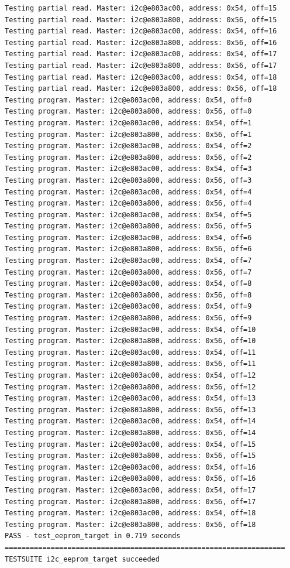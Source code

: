\documentclass[11pt,a4paper,oneside]{article}
\begin{document}
\begin{lstlisting}
Testing partial read. Master: i2c@e803ac00, address: 0x54, off=15
Testing partial read. Master: i2c@e803a800, address: 0x56, off=15
Testing partial read. Master: i2c@e803ac00, address: 0x54, off=16
Testing partial read. Master: i2c@e803a800, address: 0x56, off=16
Testing partial read. Master: i2c@e803ac00, address: 0x54, off=17
Testing partial read. Master: i2c@e803a800, address: 0x56, off=17
Testing partial read. Master: i2c@e803ac00, address: 0x54, off=18
Testing partial read. Master: i2c@e803a800, address: 0x56, off=18
Testing program. Master: i2c@e803ac00, address: 0x54, off=0
Testing program. Master: i2c@e803a800, address: 0x56, off=0
Testing program. Master: i2c@e803ac00, address: 0x54, off=1
Testing program. Master: i2c@e803a800, address: 0x56, off=1
Testing program. Master: i2c@e803ac00, address: 0x54, off=2
Testing program. Master: i2c@e803a800, address: 0x56, off=2
Testing program. Master: i2c@e803ac00, address: 0x54, off=3
Testing program. Master: i2c@e803a800, address: 0x56, off=3
Testing program. Master: i2c@e803ac00, address: 0x54, off=4
Testing program. Master: i2c@e803a800, address: 0x56, off=4
Testing program. Master: i2c@e803ac00, address: 0x54, off=5
Testing program. Master: i2c@e803a800, address: 0x56, off=5
Testing program. Master: i2c@e803ac00, address: 0x54, off=6
Testing program. Master: i2c@e803a800, address: 0x56, off=6
Testing program. Master: i2c@e803ac00, address: 0x54, off=7
Testing program. Master: i2c@e803a800, address: 0x56, off=7
Testing program. Master: i2c@e803ac00, address: 0x54, off=8
Testing program. Master: i2c@e803a800, address: 0x56, off=8
Testing program. Master: i2c@e803ac00, address: 0x54, off=9
Testing program. Master: i2c@e803a800, address: 0x56, off=9
Testing program. Master: i2c@e803ac00, address: 0x54, off=10
Testing program. Master: i2c@e803a800, address: 0x56, off=10
Testing program. Master: i2c@e803ac00, address: 0x54, off=11
Testing program. Master: i2c@e803a800, address: 0x56, off=11
Testing program. Master: i2c@e803ac00, address: 0x54, off=12
Testing program. Master: i2c@e803a800, address: 0x56, off=12
Testing program. Master: i2c@e803ac00, address: 0x54, off=13
Testing program. Master: i2c@e803a800, address: 0x56, off=13
Testing program. Master: i2c@e803ac00, address: 0x54, off=14
Testing program. Master: i2c@e803a800, address: 0x56, off=14
Testing program. Master: i2c@e803ac00, address: 0x54, off=15
Testing program. Master: i2c@e803a800, address: 0x56, off=15
Testing program. Master: i2c@e803ac00, address: 0x54, off=16
Testing program. Master: i2c@e803a800, address: 0x56, off=16
Testing program. Master: i2c@e803ac00, address: 0x54, off=17
Testing program. Master: i2c@e803a800, address: 0x56, off=17
Testing program. Master: i2c@e803ac00, address: 0x54, off=18
Testing program. Master: i2c@e803a800, address: 0x56, off=18
PASS - test_eeprom_target in 0.719 seconds
===================================================================
TESTSUITE i2c_eeprom_target succeeded


\end{lstlisting}
\end{document}
